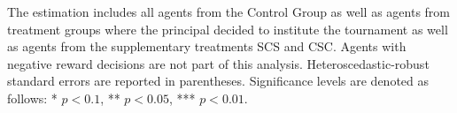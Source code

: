 \begin{landscape}
\begin{table}[!htbp]
\begin{center}
\begin{minipage}{1.2\textwidth}
The estimation includes all agents from the Control Group as well as agents from treatment groups where the principal decided to institute the tournament as well as agents from the supplementary treatments SCS and CSC. Agents with negative reward decisions are not part of this analysis. Heteroscedastic-robust standard errors are reported in parentheses. Significance levels are denoted as follows: * $p < 0.1$, ** $p < 0.05$, *** $p < 0.01$.
\end{minipage}
\end{center}
\end{table}
\end{landscape}